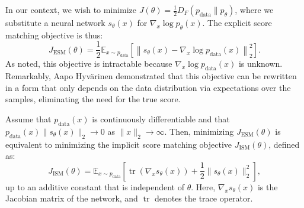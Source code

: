 In our context, we wish to minimize $J(\theta) = \frac{1}{2} D_F(p_{\text{data}} \parallel p_\theta)$, where we substitute a neural network $s_\theta(x)$ for $\nabla_x \log p_\theta(x)$. The explicit score matching objective is thus:
\begin{equation}
    J_{\text{ESM}}(\theta) = \frac{1}{2} \mathbb{E}_{x \sim p_{\text{data}}} \left[ \left\| s_\theta(x) - \nabla_x \log p_{\text{data}}(x) \right\|_2^2 \right].
\end{equation}
As noted, this objective is intractable because $\nabla_x \log p_{\text{data}}(x)$ is unknown. Remarkably, Aapo Hyvärinen demonstrated that this objective can be rewritten in a form that only depends on the data distribution via expectations over the samples, eliminating the need for the true score.

\begin{theorem}
\label{thm:implicit_score_matching}
Assume that $p_{\text{data}}(x)$ is continuously differentiable and that $p_{\text{data}}(x) \|s_\theta(x)\|_2 \to 0$ as $\|x\|_2 \to \infty$. Then, minimizing $J_{\text{ESM}}(\theta)$ is equivalent to minimizing the implicit score matching objective $J_{\text{ISM}}(\theta)$, defined as:
\begin{equation}
    J_{\text{ISM}}(\theta) = \mathbb{E}_{x \sim p_{\text{data}}} \left[ \operatorname{tr}(\nabla_x s_\theta(x)) + \frac{1}{2} \|s_\theta(x)\|_2^2 \right],
\end{equation}
up to an additive constant that is independent of $\theta$. Here, $\nabla_x s_\theta(x)$ is the Jacobian matrix of the network, and $\operatorname{tr}$ denotes the trace operator.
\end{theorem}


